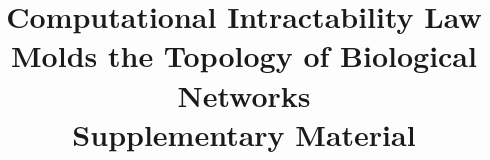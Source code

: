 \documentclass[12pt]{article}	%
\title {{\Large Computational Intractability Law Molds the Topology of Biological  Networks} \\ {\Large{\textbf{Supplementary Material}}}}
\date{}
\begin{document}
\maketitle
\begin{comment}
\tableofcontents
{%
    \color{white}
         \cite{rolland_proteome-scale_2014, yang_widespread_2016, barabasi_emergence_1999, fell_small_2000, arita_metabolic_2004, tanaka_protein_2005, fox_keller_revisiting_2005, khanin_how_2006, stelling_robustness_2004, hahn_molecular_2004, albert_error_2000, barabasi_network_2004, stumpf_critical_2012, alderson_contrasting_2010, papp_critical_2009, lynch_evolution_2007, sorrells_making_2015, aaronson_limits_2004, aaronson_guest_2005, fortnow_status_2009, vazirani_approximation_2013, lawler_fast_1979, wigderson_opening_2014, carvunis_proto-genes_2012, vinayagam_integrating_2014, pisinger_core_1999-1, pisinger_where_2005, costanzo_global_2016, livnat_analytical_2011, chastain_algorithms_2014, livnat_sex_2016, brenner_turing_2012, gerstein_architecture_2012, khurana_interpretation_2013, kim_positive_2007, mitra_integrative_2013}
}
\end{comment}
\end{document}
